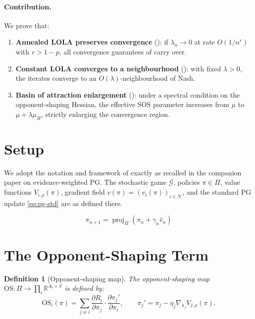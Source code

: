 \documentclass[11pt,a4paper]{article}
\newtheorem{definition}[theorem]{Definition}
\DeclareMathOperator{\proj}{proj}
\newcommand{\R}{\mathbb{R}}
\begin{document}
\paragraph{Contribution.} We prove that:
\begin{enumerate}
    \item \textbf{Annealed LOLA preserves convergence} (): if $\lambda_n \to 0$ at rate $O(1/n^r)$ with $r > 1-p$, all convergence guarantees of \cite{giannou2022} carry over.
    \item \textbf{Constant LOLA converges to a neighbourhood} (): with fixed $\lambda > 0$, the iterates converge to an $O(\lambda)$-neighbourhood of Nash.
    \item \textbf{Basin of attraction enlargement} (): under a spectral condition on the opponent-shaping Hessian, the effective SOS parameter increases from $\mu$ to $\mu + \lambda \mu_H$, strictly enlarging the convergence region.
\end{enumerate}


\section{Setup}
\label{sec:setup}

We adopt the notation and framework of \cite{giannou2022} exactly as recalled in the companion paper on evidence-weighted PG. The stochastic game $\mathcal{G}$, policies $\pi \in \Pi$, value functions $V_{i,\rho}(\pi)$, gradient field $v(\pi) = (v_i(\pi))_{i \in \mathcal{N}}$, and the standard PG update \eqref{eq:pg-std} are as defined there.

\begin{equation}
\label{eq:pg-std}
\tag{PG}
    \pi_{n+1} = \proj_\Pi(\pi_n + \gamma_n \hat{v}_n)
\end{equation}


\section{The Opponent-Shaping Term}
\label{sec:os}

\begin{definition}[Opponent-shaping map]
\label{def:os}
The \emph{opponent-shaping map} $\mathrm{OS} : \Pi \to \prod_i \R^{A_i \times S}$ is defined by:
\begin{equation}
\label{eq:os-def}
    \mathrm{OS}_i(\pi) = \sum_{j \neq i} \frac{\partial R_i}{\partial \pi_j} \cdot \frac{\partial \pi_j'}{\partial \pi_i}, \qquad \pi_j' = \pi_j - \eta_j \nabla_{\pi_j} V_{j,\rho}(\pi).
\end{equation}
\end{definition}
\end{document}
